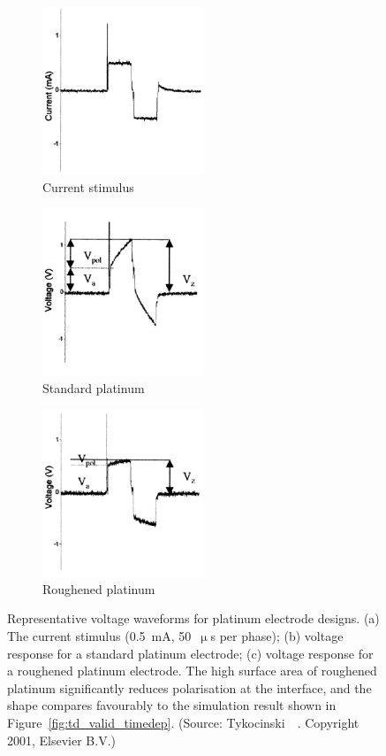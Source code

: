 \begin{figure}
    \centering

    \begin{subfigure}[t]{0.33\textwidth}
        \centering
        \includegraphics[height=5cm]{Simulations/TimeDep/tykocinski_stim}
        \caption{Current stimulus}
        \label{fig:tyko_stim}
    \end{subfigure}%
    \begin{subfigure}[t]{0.33\textwidth}
        \centering
        \includegraphics[height=5cm]{Simulations/TimeDep/tykocinski_pt0_invivo}
        \caption{Standard platinum}
        \label{fig:tyko_pt0}
    \end{subfigure}%
    \begin{subfigure}[t]{0.33\textwidth}
        \centering
        \includegraphics[height=5cm]{Simulations/TimeDep/tykocinski_hiq_invivo}
        \caption{Roughened platinum}
        \label{fig:tyko_hiq}
    \end{subfigure}
    
	\caption[Representative voltage waveforms for platinum electrode
	designs]{Representative voltage waveforms for platinum electrode
	designs. (a) The current stimulus (0.5~mA, 50~$ \upmu $s per phase);
	(b) \invivo{} voltage response for a standard platinum electrode; (c)
	\invivo{} voltage response for a roughened platinum
	electrode. The high surface area of roughened platinum significantly reduces
	polarisation at the interface, and the shape compares favourably to the
	simulation result shown in Figure~\ref{fig:td_valid_timedep}.
	(Source: Tykocinski~\etal~\cite{tykocinski2001}. Copyright \textcopyright{}
	2001, Elsevier B.V.)}
	\label{fig:tykocinski_plots}
\end{figure}

